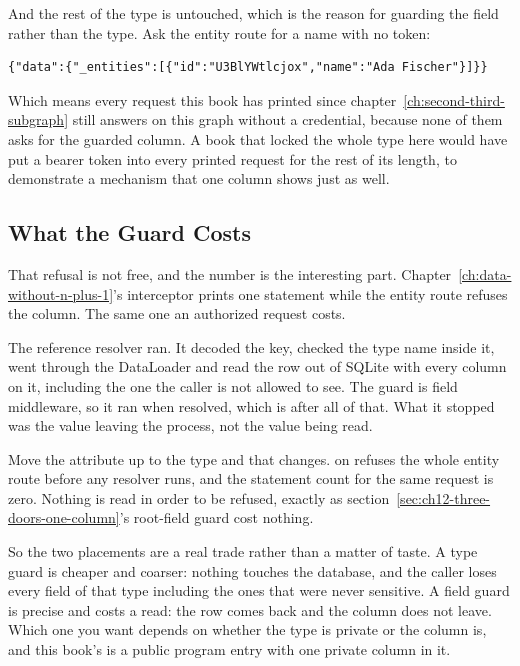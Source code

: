 %
And the rest of the type is untouched, which is the reason for guarding the
field rather than the type. Ask the entity route for a name with no token:

\begin{verbatim}
{"data":{"_entities":[{"id":"U3BlYWtlcjox","name":"Ada Fischer"}]}}
\end{verbatim}

%
Which means every request this book has printed since
chapter~\ref{ch:second-third-subgraph} still answers on this graph without a
credential, because none of them asks for the guarded column. A book that
locked the whole  type here would have put a bearer token into
every printed request for the rest of its length, to demonstrate a mechanism
that one column shows just as well.

\subsection{What the Guard Costs}

%
That refusal is not free, and the number is the interesting part.
Chapter~\ref{ch:data-without-n-plus-1}'s interceptor prints
one statement while the entity route refuses the column. The same one an
authorized request costs.

%
The reference resolver ran. It decoded the key, checked the type name inside
it, went through the DataLoader and read the row out of SQLite with every
column on it, including the one the caller is not allowed to see. The guard
is field middleware, so it ran when  resolved, which is after all
of that. What it stopped was the value leaving the process, not the value
being read.

%
Move the attribute up to the type and that changes. \code{[Authorize]} on
 refuses the whole entity route before any resolver runs,
and the statement count for the same request is zero. Nothing is
read in order to be refused, exactly as
section~\ref{sec:ch12-three-doors-one-column}'s root-field guard cost nothing.

%
So the two placements are a real trade rather than a matter of taste. A type
guard is cheaper and coarser: nothing touches the database, and the caller
loses every field of that type including the ones that were never sensitive.
A field guard is precise and costs a read: the row comes back and the column
does not leave. Which one you want depends on whether the type is private or
the column is, and this book's  is a public program entry with
one private column in it.

